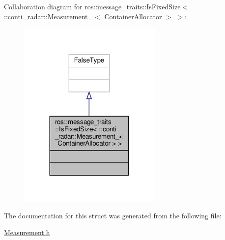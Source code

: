 Collaboration diagram for ros\+:\+:message\+\_\+traits\+:\+:Is\+Fixed\+Size$<$ \+:\+:conti\+\_\+radar\+:\+:Measurement\+\_\+$<$ Container\+Allocator $>$ $>$\+:\nopagebreak
\begin{figure}[H]
\begin{center}
\leavevmode
\includegraphics[width=200pt]{df/d97/structros_1_1message__traits_1_1IsFixedSize_3_01_1_1conti__radar_1_1Measurement___3_01ContainerAllocator_01_4_01_4__coll__graph}
\end{center}
\end{figure}


The documentation for this struct was generated from the following file\+:\begin{DoxyCompactItemize}
\item 
\hyperlink{Measurement_8h}{Measurement.\+h}\end{DoxyCompactItemize}
